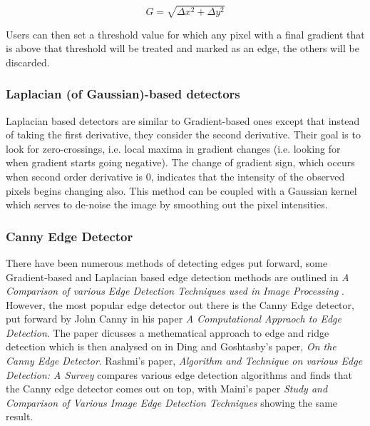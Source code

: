 \documentclass[11pt]{article}
\begin{document}
\begin{equation}
	G = \sqrt{\Delta x^2 + \Delta y^2} 
\end{equation}

Users can then set a threshold value for which any pixel with a final
gradient that is above that threshold will be treated and marked as an edge,
the others will be discarded.

\subsubsection{Laplacian (of Gaussian)-based detectors}
Laplacian based detectors are similar to Gradient-based ones except that 
instead of taking the first derivative, they consider the second derivative.
Their goal is to look for zero-crossings, i.e. local maxima in 
gradient changes (i.e. looking for when gradient starts going negative). The
change of gradient sign, which occurs when second order derivative is 0,
indicates that the intensity of the observed pixels begins changing also. This
method can be coupled with a Gaussian kernel which serves to de-noise the
image by smoothing out the pixel intensities. 


\subsubsection{Canny Edge Detector}
\label{sec:Canny}

There have been numerous methods of detecting edges put forward,
some Gradient-based and Laplacian based edge detection methods are 
outlined in 
\textit{A Comparison of various Edge Detection Techniques used in Image Processing}
\cite{Shriv12}. However, the most popular edge detector out there is the
Canny Edge detector, put forward by John Canny in his paper
\textit{A Computational Appraoch to Edge Detection}\cite{Canny86}. The paper
dicusses a methematical approach to edge and ridge detection which is then
analysed on in Ding and Goshtasby's paper, 
\textit{On the Canny Edge Detector}\cite{Ding00}. Rashmi's paper,
\textit{Algorithm and Technique on various Edge Detection: A Survey}
\cite{Rashmi13} compares various edge detection algorithms and finds that 
the Canny edge detector comes out on top, with Maini's paper 
\textit{Study and Comparison of Various Image Edge Detection Techniques} 
\cite{Maini} showing the same result.
\end{document}
